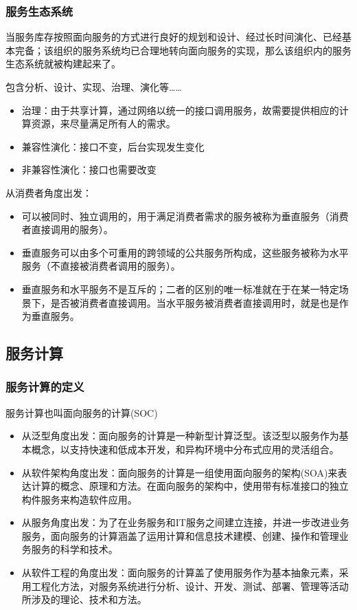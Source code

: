 \subsubsection{服务生态系统}
当服务库存按照面向服务的方式进行良好的规划和设计、经过长时间演化、已经基本完备；该组织的服务系统均已合理地转向面向服务的实现，那么该组织内的服务生态系统就被构建起来了。

包含分析、设计、实现、治理、演化等……
\begin{itemize}
    \item 治理：由于共享计算，通过网络以统一的接口调用服务，故需要提供相应的计算资源，来尽量满足所有人的需求。
\end{itemize}
\vspace{-0.8em}
\begin{multicols}{2}
    \begin{itemize}
        \item 兼容性演化：接口不变，后台实现发生变化
        \item 非兼容性演化：接口也需要改变
    \end{itemize}
\end{multicols}
\vspace{-1em}

从消费者角度出发：
\begin{itemize}
    \item 可以被同时、独立调用的，用于满足消费者需求的服务被称为垂直服务（消费者直接调用的服务）。
    \item 垂直服务可以由多个可重用的跨领域的公共服务所构成，这些服务被称为水平服务（不直接被消费者调用的服务）。
    \item 垂直服务和水平服务不是互斥的；二者的区别的唯一标准就在于在某一特定场景下，是否被消费者直接调用。当水平服务被消费者直接调用时，就是也是作为垂直服务。
\end{itemize}


\subsection{服务计算}

\subsubsection{服务计算的定义}
服务计算也叫面向服务的计算(SOC)
\begin{itemize}
    \item 从泛型角度出发：面向服务的计算是一种新型计算泛型。该泛型以服务作为基本概念，以支持快速和低成本开发，和异构环境中分布式应用的灵活组合。
    \item 从软件架构角度出发：面向服务的计算是一组使用面向服务的架构(SOA)来表达计算的概念、原理和方法。在面向服务的架构中，使用带有标准接口的独立构件服务来构造软件应用。
    \item  从服务角度出发：为了在业务服务和IT服务之间建立连接，并进一步改进业务服务，面向服务的计算涵盖了运用计算和信息技术建模、创建、操作和管理业务服务的科学和技术。
    \item 从软件工程的角度出发：面向服务的计算盖了使用服务作为基本抽象元素，采用工程化方法，对服务系统进行分析、设计、开发、测试、部署、管理等活动所涉及的理论、技术和方法。
\end{itemize}

